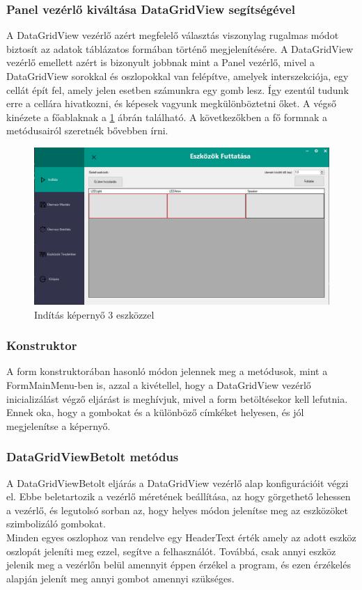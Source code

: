 \documentclass[tocnopagenum]{thesis-ekf}
\theoremstyle{definition}
\theoremstyle{remark}
\begin{document}
	\subsubsection{Panel vezérlő kiváltása DataGridView segítségével}
	A DataGridView vezérlő azért megfelelő választás viszonylag rugalmas módot biztosít az adatok táblázatos formában történő megjelenítésére.\cite{datagridc} 
	A DataGridView vezérlő emellett azért is bizonyult jobbnak mint a Panel vezérlő, mivel a DataGridView sorokkal és oszlopokkal van felépítve, amelyek interszekciója, egy cellát épít fel, amely jelen esetben számunkra egy gomb lesz. Így ezentúl tudunk erre a cellára hivatkozni, és képesek vagyunk megkülönböztetni őket.
	A végső kinézete a főablaknak a \ref{fig:inditas3eszk} ábrán található.
	A következőkben a fő formnak a metódusairól szeretnék bővebben írni.
	\begin{figure}[H]	
		\centering
		\includegraphics[scale=0.5]{Form_inditas_3eszkoz}
		\caption[Indítás képernyő 3 eszközzel]{Indítás képernyő 3 eszközzel}
		\label{fig:inditas3eszk}
	\end{figure}
	\subsubsection{Konstruktor}
	A form konstruktorában hasonló módon jelennek meg a metódusok, mint a FormMainMenu-ben is, azzal a kivétellel, hogy a DataGridView vezérlő inicializálást végző eljárást is meghívjuk, mivel a form betöltésekor kell lefutnia. Ennek oka, hogy a gombokat és a különböző címkéket helyesen, és jól megjelenítse a képernyő.
	\subsubsection{DataGridViewBetolt metódus}
	A DataGridViewBetolt eljárás a DataGridView vezérlő alap konfigurációit végzi el. Ebbe beletartozik a vezérlő méretének beállítása, az hogy görgethető lehessen a vezérlő, és legutolsó sorban az, hogy helyes módon jelenítse meg az eszközöket szimbolizáló gombokat. 
	\\
	Minden egyes oszlophoz van rendelve egy HeaderText érték amely az adott eszköz oszlopát jeleníti meg ezzel, segítve a felhasználót. Továbbá, csak annyi eszköz jelenik meg a vezérlőn belül amennyit éppen érzékel a program, és ezen érzékelés alapján jelenít meg annyi gombot amennyi szükséges. 
\end{document}

